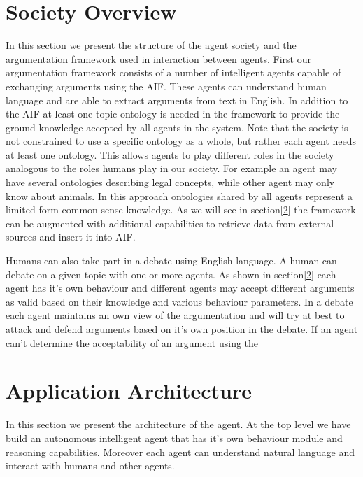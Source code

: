 
\section{Society Overview}
\label{sec:society}

In this section we present the structure of the agent society and the argumentation framework used in interaction between agents. First our argumentation framework consists of a number of intelligent agents capable of exchanging arguments using the AIF\cite{AIF}. These agents can understand human language and are able to extract arguments from text in English. In addition to the AIF at least one topic ontology is needed in the framework to provide the ground knowledge accepted by all agents in the system. Note that the society is not constrained to use a specific ontology as a whole, but rather each agent needs at least one ontology. This allows agents to play different roles in the society analogous to the roles humans play in our society. For example an agent may have several ontologies describing legal concepts, while other agent may only know about animals. In this approach ontologies shared by all agents represent a limited form common sense knowledge. As we will see in section[\ref{sec:application}] the framework can be augmented with additional capabilities to retrieve data from external sources and insert it into AIF. 

Humans can also take part in a debate using English language. A human can debate on a given topic with one or more agents. As shown in section[\ref{sec:application}] each agent has it's own behaviour and different agents may accept different arguments as valid based on their knowledge and various behaviour parameters. In a debate each agent maintains an own view of the argumentation and will try at best to attack and defend arguments based on it's own position in the debate. If an agent can't determine the acceptability of an argument using the 

\section{Application Architecture}
\label{sec:application}

In this section we present the architecture of the agent. At the top level we have build an autonomous intelligent agent that has it's own behaviour module and reasoning capabilities. Moreover each agent can understand natural language and interact with humans and other agents.
